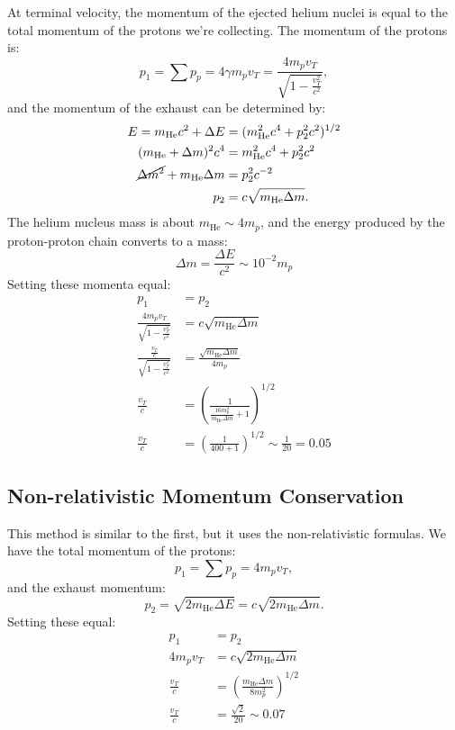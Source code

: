 \documentclass[a4paper]{article}
\def\mhe{m_{\mathrm{He}}}
\begin{document}
      At terminal velocity, the momentum of the ejected helium nuclei is equal to the total momentum of the protons we're collecting.  The momentum of the protons is:
      \begin{equation}
          p_{1} = \sum p_{p} = 4\gamma m_{p}v_{T} = \frac{4m_{p}v_{T}}{\sqrt{1-\frac{v_{T}^{2}}{c^{2}}}},
      \end{equation}
      and the momentum of the exhaust can be determined by:
      \begin{align}
          E = \mhe c^{2} + \Delta E &= (\mhe^{2}c^{4} + p_{2}^{2}c^{2})^{1/2}\\
          (\mhe+\Delta m)^{2}c^{4} &= \mhe^{2}c^{4} + p_{2}^{2}c^{2}\\
          \cancel{\Delta m^{2}} + \mhe\Delta m &= p_{2}^{2}c^{-2}\\
          p_{2} &= c\sqrt{\mhe\Delta m}.
      \end{align}
      The helium nucleus mass is about $\mhe\sim 4 m_{p}$, and the energy produced by the proton-proton chain converts to a mass:
      \begin{equation}
          \Delta m = \frac{\Delta E}{c^{2}} \sim 10^{-2}m_{p}
      \end{equation}
      Setting these momenta equal:
      \begin{align}
          p_{1} &= p_{2}\\
          \frac{4m_{p}v_{T}}{\sqrt{1-\frac{v_{T}^{2}}{c^{2}}}} &= c\sqrt{\mhe\Delta m}\\
          \frac{\frac{v_{T}}{c}}{\sqrt{1-\frac{v_{T}^{2}}{c^{2}}}} &= \frac{\sqrt{\mhe\Delta m}}{4m_{p}}\\
          \frac{v_{T}}{c} &= \left(\frac{1}{\frac{16m_{p}^{2}}{\mhe\Delta m}+1}\right)^{1/2}\\
          \frac{v_{T}}{c} &= \left(\frac{1}{400+1}\right)^{1/2} \sim \frac{1}{20} = 0.05
      \end{align}
    
    \subsection{Non-relativistic Momentum Conservation}
      This method is similar to the first, but it uses the non-relativistic formulas.  We have the total momentum of the protons:
      \begin{equation}
          p_{1} = \sum p_{p} = 4m_{p}v_{T},
      \end{equation}
      and the exhaust momentum:
      \begin{equation}
          p_{2} = \sqrt{2\mhe\Delta E} = c\sqrt{2\mhe\Delta m}.
      \end{equation}
      Setting these equal:
      \begin{align}
        p_{1} &= p_{2}\\
        4m_{p}v_{T} &= c\sqrt{2\mhe\Delta m}\\
        \frac{v_{T}}{c} &= \left(\frac{\mhe\Delta m}{8m_{p}^{2}}\right)^{1/2}\\
        \frac{v_{T}}{c} &= \frac{\sqrt{2}}{20} \sim 0.07
      \end{align}
    
\end{document}
